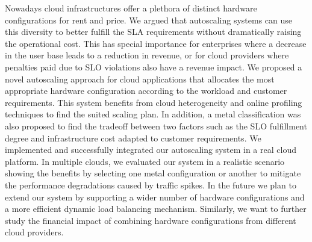 
Nowadays cloud infrastructures offer a plethora of distinct hardware configurations for rent and price. We argued that autoscaling systems can use this diversity to better fulfill the SLA requirements without dramatically raising the operational cost. This has special importance for enterprises where a decrease in the user base leads to a reduction in revenue, or for cloud providers where penalties paid due to SLO violations also have a revenue impact. We proposed a novel autoscaling approach for cloud applications that allocates the most appropriate hardware configuration according to the workload and customer requirements. This system benefits from cloud heterogeneity and online profiling techniques to find the suited scaling plan. In addition, a metal classification was also proposed to find the tradeoff between two factors such as the SLO fulfillment degree and infrastructure cost adapted to customer requirements. We implemented and successfully integrated our autoscaling system in a real cloud platform. In multiple clouds, we evaluated our system in a realistic scenario showing the benefits by selecting one metal configuration or another to mitigate the performance degradations caused by traffic spikes. 
In the future we plan to extend our system by supporting a wider number of hardware configurations and a more efficient dynamic load balancing mechanism. Similarly, we want to further study the financial impact of combining hardware configurations from different cloud providers.










